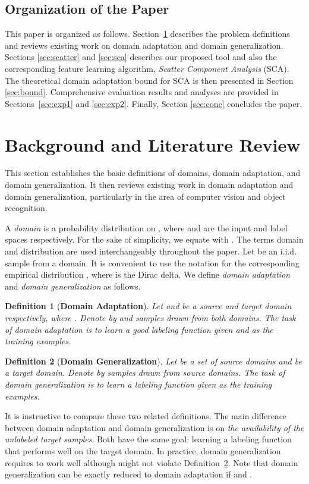 \documentclass[10pt,journal,compsoc]{IEEEtran}
\newtheorem{defn}{Definition}
\begin{document}
\vspace{-1em}
\subsection{Organization of the Paper}
This paper is organized as follows.
Section~\ref{sec:litrev} describes the problem definitions and reviews existing work on domain adaptation and domain generalization.
Sections \ref{sec:scatter} and \ref{sec:sca} describes our proposed tool and also the corresponding feature learning algorithm, \emph{Scatter Component Analysis} (SCA).
The theoretical domain adaptation bound for SCA is then presented in Section \ref{sec:bound}.
Comprehensive evaluation results and analyses are provided in Sections~\ref{sec:exp1} and \ref{sec:exp2}.
Finally, Section \ref{sec:conc} concludes the paper.

\vspace{-1em}
\section{Background and Literature Review}
\label{sec:litrev}
This section establishes the basic definitions of domains, domain adaptation, and domain generalization.
It then reviews existing work in domain adaptation and domain generalization, particularly in the area of computer vision and object recognition.

A \emph{domain} is a probability distribution  on , where  and  are the input and label spaces respectively. 
For the sake of simplicity, we equate  with .
The terms domain and distribution are used interchangeably throughout the paper. 
Let  be an i.i.d. sample from a domain. It is convenient to use the notation  for the corresponding empirical distribution , where  is the Dirac delta.
We define \emph{domain adaptation} and \emph{domain generalization} as follows.
\begin{defn}[\textbf{Domain Adaptation}]
  \label{def:domadap}
 Let  and  be a source and target domain respectively, where .
 Denote by  and  samples drawn from both domains.
 The task of domain adaptation is to learn a good labeling function  given  and  as the training examples.
\end{defn}

\begin{defn}[\textbf{Domain Generalization}]
  \label{def:domgen}
  Let  be a set of  source domains and  be a target domain.
  Denote by  samples drawn from  source domains.
  The task of domain generalization is to learn a labeling function  given  as the training examples.
\end{defn}
It is instructive to compare these two related definitions.
The main difference between domain adaptation and domain generalization is on \emph{the availability of the unlabeled target samples}.
Both have the same goal: learning a labeling function  that performs well on the target domain.
In practice, domain generalization requires  to work well although  might not violate Definition~\ref{def:domgen}.
Note that domain generalization can be exactly reduced to domain adaptation if  and .
\end{document}
